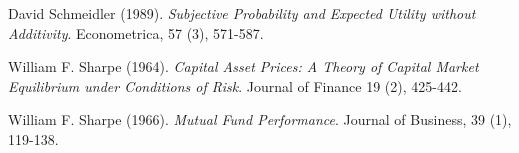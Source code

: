 \documentclass[10.0pt]{article}
\begin{document}
\begin{thebibliography}{99}

 David Schmeidler (1989). {\it Subjective Probability and Expected Utility without Additivity}. Econometrica, 57 (3), 571-587.

 William F. Sharpe (1964). {\it Capital Asset Prices: A Theory of Capital Market Equilibrium under Conditions of Risk}. Journal of Finance 19 (2), 425-442.

 William F. Sharpe (1966). {\it Mutual Fund Performance}. Journal of Business, 39 (1), 119-138.

\end{thebibliography}
\end{document}
